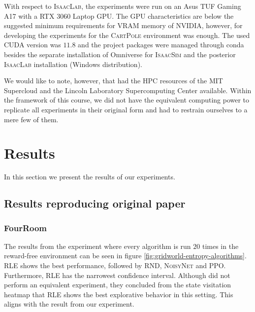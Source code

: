 \documentclass[10pt]{article} %
\begin{document}
With respect to \textsc{IsaacLab}, the experiments were run on an Asus TUF Gaming A17 with a RTX 3060 Laptop GPU. The GPU characteristics are below the suggested minimum requirements for VRAM memory of NVIDIA, however, for developing the experiments for the \textsc{CartPole} environment was enough. The used CUDA version was $11.8$ and the project packages were managed through conda besides the separate installation of Omniverse for \textsc{IsaacSim} and the posterior \textsc{IsaacLab} installation (Windows distribution). 

\noindent We would like to note, however, that \cite{rle-paper} had the HPC resources of the MIT Supercloud and the Lincoln Laboratory Supercomputing Center available. Within the framework of this course, we did not have the equivalent computing power to replicate all experiments in their original form and had to restrain ourselves to a mere few of them.

\hypertarget{sec4}{\section{Results}}

In this section we present the results of our experiments.



\subsection{Results reproducing original paper}

\subsubsection{FourRoom}
The results from the experiment where every algorithm is run $20$ times in the reward-free environment can be seen in figure \ref{fig:gridworld-entropy-algorithms}. \textsc{RLE} shows the best performance, followed by \textsc{RND}, \textsc{NoisyNet} and \textsc{PPO}. Furthermore, \textsc{RLE} has the narrowest confidence interval. Although \cite{rle-paper} did not perform an equivalent experiment, they concluded from the state visitation heatmap that \textsc{RLE} shows the best explorative behavior in this setting. This aligns with the result from our experiment. 
\end{document}
